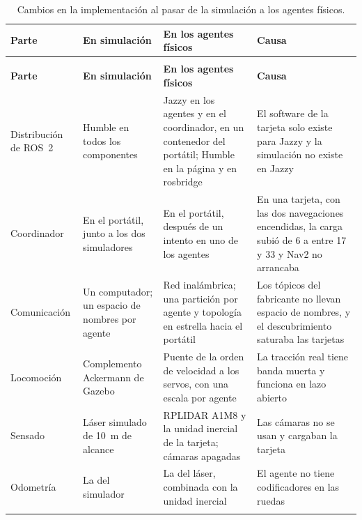 {\footnotesize{}
\setlength{\LTpre}{0.6\baselineskip}\setlength{\LTpost}{0.6\baselineskip}
\begin{longtable}{@{}>{\raggedright\arraybackslash}p{}>{\raggedright\arraybackslash}p{}>{\raggedright\arraybackslash}p{}>{\raggedright\arraybackslash}p{}@{}}
  \caption{Cambios en la implementación al pasar de la simulación a los agentes físicos.}
  \label{tab:sim-vehiculos} \\
  \toprule
  \textbf{Parte} & \textbf{En simulación} & \textbf{En los agentes físicos} & \textbf{Causa} \\ \midrule
  \endfirsthead
  \multicolumn{4}{@{}l}{\textit{Continuación de la tabla~\ref{tab:sim-vehiculos}}} \\ \addlinespace
  \toprule
  \textbf{Parte} & \textbf{En simulación} & \textbf{En los agentes físicos} & \textbf{Causa} \\ \midrule
  \endhead
  \bottomrule
  \endfoot
  \bottomrule
  \endlastfoot
    Distribución de ROS~2 & Humble en todos los componentes & Jazzy en los agentes y en el coordinador, en un contenedor del portátil; Humble en la página y en rosbridge & El software de la tarjeta solo existe para Jazzy y la simulación no existe en Jazzy \\ \addlinespace
    Coordinador & En el portátil, junto a los dos simuladores & En el portátil, después de un intento en uno de los agentes & En una tarjeta, con las dos navegaciones encendidas, la carga subió de 6 a entre 17 y 33 y Nav2 no arrancaba \\ \addlinespace
    Comunicación & Un computador; un espacio de nombres por agente & Red inalámbrica; una partición por agente y topología en estrella hacia el portátil & Los tópicos del fabricante no llevan espacio de nombres, y el descubrimiento saturaba las tarjetas \\ \addlinespace
    Locomoción & Complemento Ackermann de Gazebo & Puente de la orden de velocidad a los servos, con una escala por agente & La tracción real tiene banda muerta y funciona en lazo abierto \\ \addlinespace
    Sensado & Láser simulado de 10~m de alcance & RPLIDAR A1M8 y la unidad inercial de la tarjeta; cámaras apagadas & Las cámaras no se usan y cargaban la tarjeta \\ \addlinespace
    Odometría & La del simulador & La del láser, combinada con la unidad inercial & El agente no tiene codificadores en las ruedas \\ \addlinespace

\end{longtable}}
